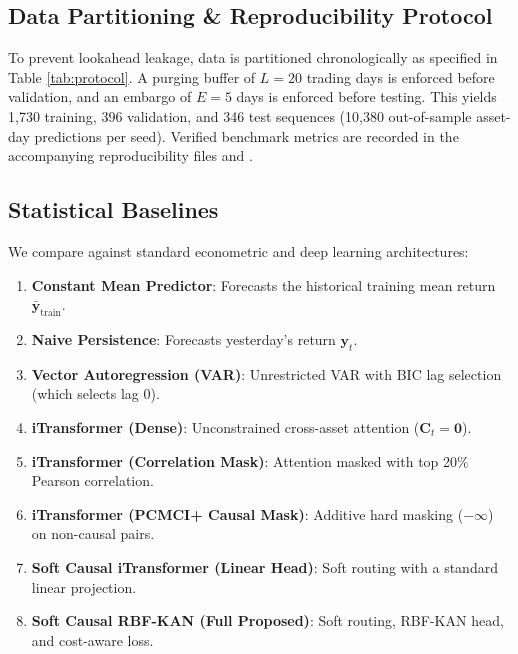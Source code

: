 \documentclass[10pt,twocolumn,a4paper]{article}
\begin{document}
\subsection{Data Partitioning \& Reproducibility Protocol}
To prevent lookahead leakage, data is partitioned chronologically as specified in Table \ref{tab:protocol}. A purging buffer of $L = 20$ trading days is enforced before validation, and an embargo of $E = 5$ days is enforced before testing. This yields 1,730 training, 396 validation, and 346 test sequences (10,380 out-of-sample asset-day predictions per seed). Verified benchmark metrics are recorded in the accompanying reproducibility files  and .

\subsection{Statistical Baselines}
We compare against standard econometric and deep learning architectures:
\begin{enumerate}
    \item \textbf{Constant Mean Predictor}: Forecasts the historical training mean return $\bar{\mathbf{y}}_{\mathrm{train}}$.
    \item \textbf{Naive Persistence}: Forecasts yesterday's return $\mathbf{y}_t$.
    \item \textbf{Vector Autoregression (VAR)}: Unrestricted VAR with BIC lag selection (which selects lag 0).
    \item \textbf{iTransformer (Dense)}: Unconstrained cross-asset attention ($\mathbf{C}_t = \mathbf{0}$).
    \item \textbf{iTransformer (Correlation Mask)}: Attention masked with top 20\% Pearson correlation.
    \item \textbf{iTransformer (PCMCI+ Causal Mask)}: Additive hard masking ($-\infty$) on non-causal pairs.
    \item \textbf{Soft Causal iTransformer (Linear Head)}: Soft routing with a standard linear projection.
    \item \textbf{Soft Causal RBF-KAN (Full Proposed)}: Soft routing, RBF-KAN head, and cost-aware loss.
\end{enumerate}
\end{document}
